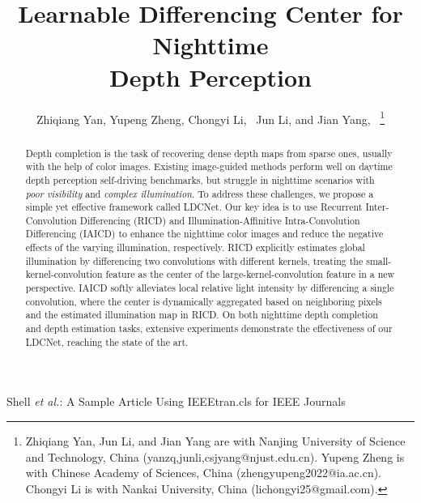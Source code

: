 \documentclass[lettersize,journal]{IEEEtran}
\begin{document}
\title{Learnable Differencing Center for Nighttime \\ Depth Perception}


\author{Zhiqiang Yan, Yupeng Zheng, Chongyi Li,~ Jun Li, and Jian Yang,~
\thanks{
Zhiqiang Yan, Jun Li, and Jian Yang are with Nanjing University of Science and Technology, China ({yanzq,junli,csjyang}@njust.edu.cn). 
Yupeng Zheng is with Chinese Academy of Sciences, China (zhengyupeng2022@ia.ac.cn). 
Chongyi Li is with Nankai University, China (lichongyi25@gmail.com).
}
}

%
{Shell \MakeLowercase{\textit{et al.}}: A Sample Article Using IEEEtran.cls for IEEE Journals}


\maketitle

\begin{abstract}
Depth completion is the task of recovering dense depth maps from sparse ones, usually with the help of color images. Existing image-guided methods perform well on daytime depth perception self-driving benchmarks, but struggle in nighttime scenarios with \emph{poor visibility} and \emph{complex illumination}. To address these challenges, we propose a simple yet effective framework called LDCNet. Our key idea is to use Recurrent Inter-Convolution Differencing (RICD) and Illumination-Affinitive Intra-Convolution Differencing (IAICD) to enhance the nighttime color images and reduce the negative effects of the varying illumination, respectively. RICD explicitly estimates global illumination by differencing two convolutions with different kernels, treating the small-kernel-convolution feature as the center of the large-kernel-convolution feature in a new perspective. IAICD softly alleviates local relative light intensity by differencing a single convolution, where the center is dynamically aggregated based on neighboring pixels and the estimated illumination map in RICD. On both nighttime depth completion and depth estimation tasks, extensive experiments demonstrate the effectiveness of our LDCNet, reaching the state of the art. %
\end{abstract}
\end{document}
